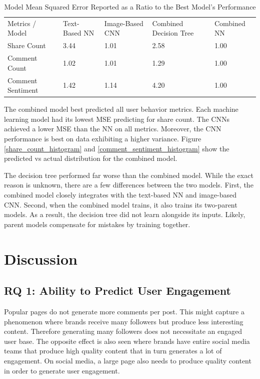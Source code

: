 \documentclass[mksc,blindrev]{informs3} %
\begin{document}
\begin{table}[]
\centering
\begin{tabular}{lllll}
Metrics / Model & Text-Based NN & Image-Based CNN & Combined Decision Tree & Combined NN \\
Share Count       & 3.44 & 1.01 & 2.58 & 1.00 \\
Comment Count     & 1.02 & 1.01 & 1.29 & 1.00 \\
Comment Sentiment & 1.42 & 1.14 & 4.20 & 1.00
\end{tabular}
\caption{\label{mse_ratios}Model Mean Squared Error Reported as a Ratio to the Best Model's Performance}
\end{table}

The combined model best predicted all user behavior metrics. Each machine learning model had its lowest MSE predicting for share count. The CNNs achieved a lower MSE than the NN on all metrics. Moreover, the CNN performance is best on data exhibiting a higher variance. Figure \ref{share_count_histogram} and \ref{comment_sentiment_histogram} show the predicted vs actual distribution for the combined model.

The decision tree performed far worse than the combined model. While the exact reason is unknown, there are a few differences between the two models. First, the combined model closely integrates with the text-based NN and image-based CNN. Second, when the combined model trains, it also trains its two-parent models. As a result, the decision tree did not learn alongside its inputs. Likely, parent models compensate for mistakes by training together.

\section{Discussion}

\subsection{RQ 1: Ability to Predict User Engagement}

Popular pages do not generate more comments per post. This might capture a phenomenon where brands receive many followers but produce less interesting content. Therefore generating many followers does not necessitate an engaged user base. The opposite effect is also seen where brands have entire social media teams that produce high quality content that in turn generates a lot of engagement. On social media, a large page also needs to produce quality content in order to generate user engagement.
\end{document}
